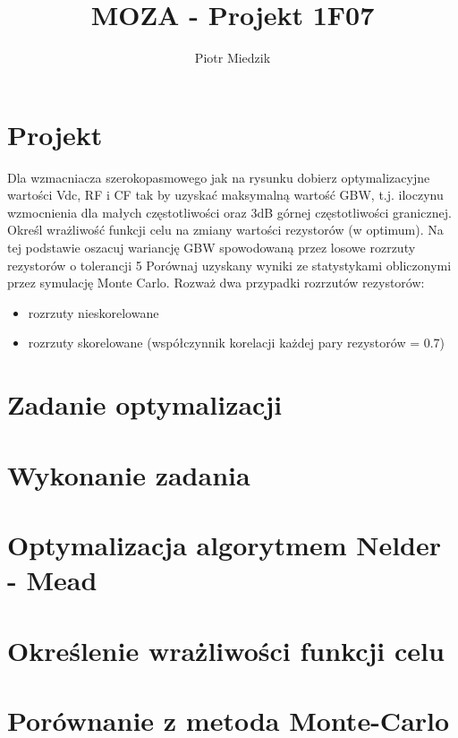 \documentclass[10pt,a4paper]{article}
\author{Piotr Miedzik}
\title{MOZA - Projekt 1F07}
\begin{document}
\maketitle

\listoftodos
\section{Projekt}


Dla wzmacniacza szerokopasmowego jak na rysunku dobierz optymalizacyjne wartości Vdc, RF i CF tak by uzyskać maksymalną wartość GBW,
t.j. iloczynu wzmocnienia dla małych częstotliwości oraz 3dB górnej częstotliwości granicznej.
Określ wrażliwość funkcji celu na zmiany wartości rezystorów (w optimum).
Na tej podstawie oszacuj wariancję GBW spowodowaną przez losowe rozrzuty rezystorów o tolerancji 5%
Porównaj uzyskany wyniki ze statystykami obliczonymi przez symulację Monte Carlo.
Rozważ dwa przypadki rozrzutów rezystorów:
\begin{itemize}
\item rozrzuty nieskorelowane
\item rozrzuty skorelowane (współczynnik korelacji każdej pary rezystorów = 0.7)
\end{itemize}

\section{Zadanie optymalizacji}

\section{Wykonanie zadania}

\section{Optymalizacja algorytmem Nelder - Mead}

\section{Określenie wrażliwości funkcji celu}

\section{Porównanie z metoda Monte-Carlo}
\end{document}
